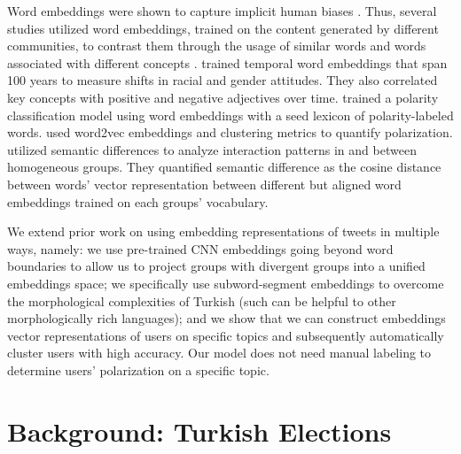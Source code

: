 \documentclass[letterpaper]{article} \usepackage{aaai20}  \usepackage{times}  \usepackage{stackengine}
\begin{document}
Word embeddings were shown to capture implicit human biases \citep{caliskan2017semantics}. Thus, several studies utilized word embeddings, trained on the content generated by different communities, to contrast them through the usage of similar words and words associated with different concepts \citep{garg2018word,giatsoglou2017sentiment}.   \cite{garg2018word} trained temporal word embeddings that span 100 years to measure shifts in racial and gender attitudes. They also correlated key concepts with positive and negative adjectives over time.  
\cite{giatsoglou2017sentiment} trained a polarity classification model using word embeddings with a seed lexicon of polarity-labeled words. \cite{yang2017quantifying} used word2vec embeddings and clustering metrics to quantify polarization. 
\cite{an2019political} utilized semantic differences to analyze interaction patterns in and between homogeneous groups. They quantified semantic difference as the cosine distance between words' vector representation between different but aligned word embeddings trained on each groups' vocabulary.

We extend prior work on using embedding representations of tweets in multiple ways, namely: we use pre-trained CNN embeddings going beyond word boundaries to allow us to project groups with divergent groups into a unified embeddings space; we specifically use subword-segment embeddings to overcome the morphological complexities of Turkish (such can be helpful to other morphologically rich languages); and we show that we can construct embeddings vector representations of users on specific topics and subsequently automatically cluster users with high accuracy. Our model does not need manual labeling  to determine users' polarization on a specific topic.



\vspace{-0.2cm}
\section{Background: Turkish Elections}
\end{document}
